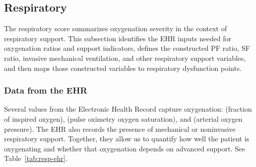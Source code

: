 \documentclass[letterpaper,10pt]{article}
\begin{document}
\subsection{Respiratory}\label{sec:resp}

The respiratory score summarizes oxygenation severity in the context of
respiratory support. This subsection identifies the EHR inputs needed for
oxygenation ratios and support indicators, defines the constructed PF ratio, SF
ratio, invasive mechanical ventilation, and other respiratory support variables,
and then maps those constructed variables to respiratory dysfunction points.

\subsubsection{Data from the EHR}\label{sec:resp-ehr}

Several values from the Electronic Health Record capture oxygenation: \fiotwo{}
(fraction of inspired oxygen), \spotwo (pulse oximetry oxygen saturation), and
\paotwo (arterial oxygen pressure). The EHR also records the presence of
mechanical or noninvasive respiratory support.
Together, they allow us to quantify how well the patient is oxygenating and
whether that oxygenation depends on advanced support.  See
Table~\ref{tab:resp-ehr}.
\end{document}

